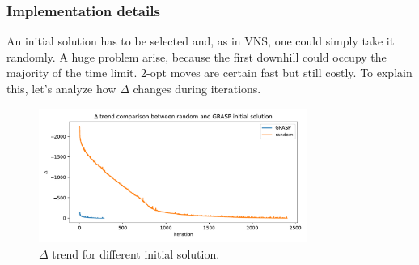 \subsubsection{Implementation details}
An initial solution has to be selected and, as in VNS, one could simply take it
randomly. A huge problem arise, because the first downhill could occupy the
majority of the time limit. $2$-opt moves are certain fast but still costly. To
explain this, let's analyze how $\Delta$ changes during iterations.

\begin{figure}[h!]
    \centering
    \includegraphics[width=0.78\textwidth]{figures/delta_trend}
    \caption{$\Delta$ trend for different initial solution.}
\end{figure}

